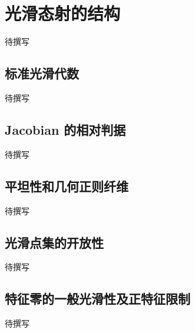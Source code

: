 
% 
% 

\section{光滑态射的结构}
\label{g5:sec:1502}

待撰写

\subsection{标准光滑代数}
\label{g5:subsec:1502:01}
待撰写

\subsection{Jacobian 的相对判据}
\label{g5:subsec:1502:02}
待撰写

\subsection{平坦性和几何正则纤维}
\label{g5:subsec:1502:03}
待撰写

\subsection{光滑点集的开放性}
\label{g5:subsec:1502:04}
待撰写

\subsection{特征零的一般光滑性及正特征限制}
\label{g5:subsec:1502:05}
待撰写
